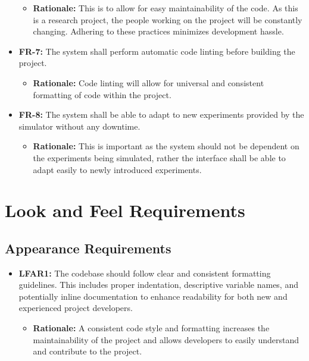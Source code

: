 \documentclass[12pt]{article}
\begin{document}
\begin{itemize}
\begin{itemize}
  \item \textbf{Rationale:} This is to allow for easy maintainability of the code. As this is a research project, the people working on the project will be constantly changing. Adhering to these practices minimizes development hassle.
\end{itemize}
\item \textbf{FR-7:} The system shall perform automatic code linting before building the project.
\begin{itemize}
  \item \textbf{Rationale:} Code linting will allow for universal and consistent formatting of code within the project. 
\end{itemize}
\item \textbf{FR-8:} The system shall be able to adapt to new experiments provided by the simulator without any downtime. 
  \begin{itemize}
    \item \textbf{Rationale:} This is important as the system should not be dependent on the experiments being simulated, rather the interface shall be able to adapt easily to newly introduced experiments. 
  \end{itemize}
\end{itemize}
\section{Look and Feel Requirements}

\subsection{Appearance Requirements}

\begin{itemize}
  \item \textbf{LFAR1:}  The codebase should follow clear and consistent formatting guidelines. This includes proper indentation, descriptive variable names, and potentially inline documentation to enhance readability for both new and experienced project developers.
      \begin{itemize}
        \item \textbf{Rationale:} A consistent code style and formatting increases the maintainability of the project and allows developers to easily understand and contribute to the project. 
      \end{itemize}
\end{itemize}
\end{document}
